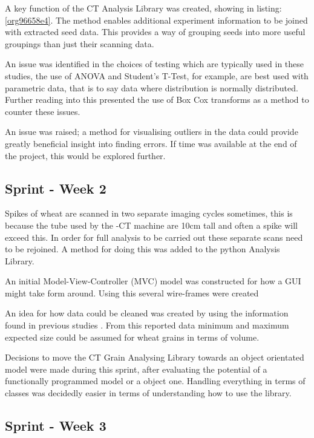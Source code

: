 \documentclass[11pt]{report}
\begin{document}
A key function of the CT Analysis Library was created, showing in listing:\ref{org96658e4}. The method enables additional experiment information to be joined with extracted seed data. This provides a way of grouping seeds into more useful groupings than just their scanning data.

An issue was identified in the choices of testing which are typically used in these studies, the use of ANOVA and Student's T-Test, for example, are best used with parametric data, that is to say data where distribution is normally distributed. Further reading into this presented the use of Box Cox transforms as a method to counter these issues.

An issue was raised; a method for visualising outliers in the data could provide greatly beneficial insight into finding errors. If time was available at the end of the project, this would be explored further.

\subsection{Sprint - Week 2}
\label{sec:org093d920}

Spikes of wheat are scanned in two separate imaging cycles sometimes, this is because the tube used by the \textmu{}-CT machine are 10cm tall and often a spike will exceed this. In order for full analysis to be carried out these separate scans need to be rejoined. A method for doing this was added to the python Analysis Library.

An initial Model-View-Controller (MVC) model was constructed for how a GUI might take form around. Using this several wire-frames were created

An idea for how data could be cleaned was created by using the information found in previous studies \cite{Hughes2017}. From this reported data minimum and maximum expected size could be assumed for wheat grains in terms of volume.

Decisions to move the CT Grain Analysing Library towards an object orientated model were made during this sprint, after evaluating the potential of a functionally programmed model or a object one. Handling everything in terms of classes was decidedly easier in terms of understanding how to use the library.

\subsection{Sprint - Week 3}
\label{sec:org8c0fc8d}
\end{document}
